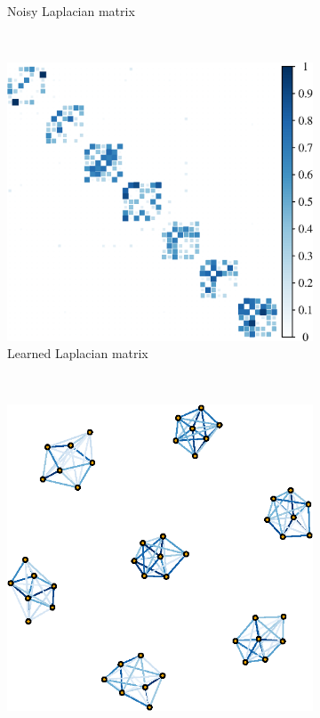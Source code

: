 \begin{figure}[!htb]
\begin{subfigure}[b]{0.3\textwidth}
        \caption{Noisy Laplacian matrix}
    \end{subfigure}
    ~ %
    \begin{subfigure}[b]{0.3\textwidth}
        \includegraphics[width=\textwidth]{model-mismatch/est_mat.eps}
        \caption{Learned Laplacian matrix}
    \end{subfigure}
        \\
    \begin{subfigure}[b]{0.3\textwidth}
        \includegraphics[width=\textwidth]{model-mismatch/true_graph.eps}

\end{subfigure}
\end{figure}
